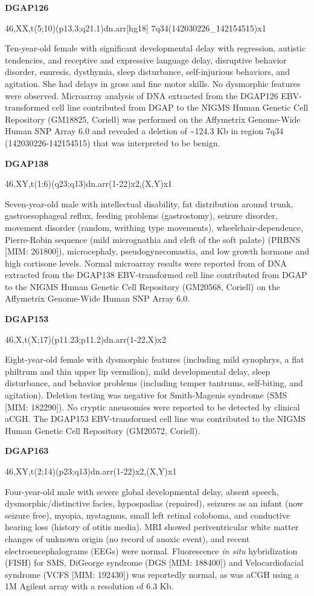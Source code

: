 \documentclass[a4paper,twoside=true,openright,parskip=full,chapterprefix=true,11pt,headings=normal,bibliography=totoc,listof=totoc,titlepage=on,captions=tableabove,draft=false]{scrreprt}
\theoremstyle{definition}
\theoremstyle{definition}
\theoremstyle{definition}
\theoremstyle{remark}
\begin{document}
\textbf{DGAP126}

46,XX,t(5;10)(p13.3;q21.1)dn.arr{[}hg18{]} 7q34(142030226\_142154515)x1

Ten-year-old female with significant developmental delay with
regression, autistic tendencies, and receptive and expressive language
delay, disruptive behavior disorder, enuresis, dysthymia, sleep
disturbance, self-injurious behaviors, and agitation. She had delays in
gross and fine motor skills. No dysmorphic features were observed.
Microarray analysis of DNA extracted from the DGAP126 EBV-transformed
cell line contributed from DGAP to the NIGMS Human Genetic Cell
Repository (GM18825, Coriell) was performed on the Affymetrix
Genome-Wide Human SNP Array 6.0 and revealed a deletion of
\textasciitilde{}124.3 Kb in region 7q34 (142030226-142154515) that was
interpreted to be benign.

\textbf{DGAP138}

46,XY,t(1;6)(q23;q13)dn.arr(1-22)x2,(X,Y)x1

Seven-year-old male with intellectual disability, fat distribution
around trunk, gastroesophageal reflux, feeding problems (gastrostomy),
seizure disorder, movement disorder (random, writhing type movements),
wheelchair-dependence, Pierre-Robin sequence (mild micrognathia and
cleft of the soft palate) (PRBNS {[}MIM: 261800{]}), microcephaly,
pseudogynecomastia, and low growth hormone and high cortisone levels.
Normal microarray results were reported from of DNA extracted from the
DGAP138 EBV-transformed cell line contributed from DGAP to the NIGMS
Human Genetic Cell Repository (GM20568, Coriell) on the Affymetrix
Genome-Wide Human SNP Array 6.0.

\textbf{DGAP153}

46,X,t(X;17)(p11.23;p11.2)dn.arr(1-22,X)x2

Eight-year-old female with dysmorphic features (including mild
synophrys, a flat philtrum and thin upper lip vermilion), mild
developmental delay, sleep disturbance, and behavior problems (including
temper tantrums, self-biting, and agitation). Deletion testing was
negative for Smith-Magenis syndrome (SMS {[}MIM: 182290{]}). No cryptic
aneusomies were reported to be detected by clinical aCGH. The DGAP153
EBV-transformed cell line was contributed to the NIGMS Human Genetic
Cell Repository (GM20572, Coriell).

\textbf{DGAP163}

46,XY,t(2;14)(p23;q13)dn.arr(1-22)x2,(X,Y)x1

Four-year-old male with severe global developmental delay, absent
speech, dysmorphic/distinctive facies, hypospadias (repaired), seizures
as an infant (now seizure free), myopia, nystagmus, small left retinal
coloboma, and conductive hearing loss (history of otitis media). MRI
showed periventricular white matter changes of unknown origin (no record
of anoxic event), and recent electroencephalograms (EEGs) were normal.
Fluorescence \emph{in situ} hybridization (FISH) for SMS, DiGeorge
syndrome (DGS {[}MIM: 188400{]}) and Velocardiofacial syndrome (VCFS
{[}MIM: 192430{]}) was reportedly normal, as was aCGH using a 1M Agilent
array with a resolution of 6.3 Kb.
\end{document}

